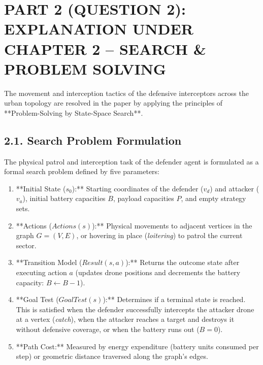 \documentclass[../main.tex]{subfiles}
\begin{document}

\section{PART 2 (QUESTION 2): EXPLANATION UNDER CHAPTER 2 -- SEARCH \& PROBLEM SOLVING}

The movement and interception tactics of the defensive interceptors across the urban topology are resolved in the paper \cite{mutzari2025defending} by applying the principles of **Problem-Solving by State-Space Search**.

\subsection{2.1. Search Problem Formulation}
The physical patrol and interception task of the defender agent is formulated as a formal search problem defined by five parameters:
\begin{enumerate}
    \item **Initial State ($s_0$):** Starting coordinates of the defender ($v_d$) and attacker ($v_a$), initial battery capacities $B$, payload capacities $P$, and empty strategy sets.
    \item **Actions ($Actions(s)$):** Physical movements to adjacent vertices in the graph $G=(V,E)$, or hovering in place (\textit{loitering}) to patrol the current sector.
    \item **Transition Model ($Result(s, a)$):** Returns the outcome state after executing action $a$ (updates drone positions and decrements the battery capacity: $B \leftarrow B - 1$).
    \item **Goal Test ($GoalTest(s)$):** Determines if a terminal state is reached. This is satisfied when the defender successfully intercepts the attacker drone at a vertex (\textit{catch}), when the attacker reaches a target and destroys it without defensive coverage, or when the battery runs out ($B = 0$).
    \item **Path Cost:** Measured by energy expenditure (battery units consumed per step) or geometric distance traversed along the graph's edges.
\end{enumerate}
\end{document}
